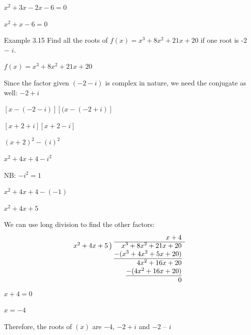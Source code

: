 $x^2 + 3x - 2x - 6 = 0$

$x^2 + x - 6 = 0$

\begin{example}{Example 3.15}
Find all the roots of $f(x) = x^3 + 8x^2 + 21x + 20$ if one root is -2 $-$ $i$.

\solution
$f(x) = x^3 + 8x^2 + 21x + 20$

Since the factor given $(-2 - i)$ is complex in nature, we need the conjugate as
well: $-2 + i$

$[x - (-2 - i)][(x - (-2 + i)]$

$[x + 2 + i][x + 2 - i]$

$(x + 2)^2 - (i)^2$

$x^2 + 4x + 4 - i^2$

NB: $-i^2 = 1$

$x^2 + 4x + 4 - (-1)$

$x^2 + 4x + 5$

We can use long division to find the other factors:
\[
\begin{array}{r@{\;}r}
 & x + 4 \\ \cline{2-2}
x^2 + 4x + 5\,\big) & x^3 + 8x^2 + 21x + 20 \\
 & \underline{-(x^3 + 4x^2 + 5x + 20)} \\
 & 4x^2 + 16x + 20 \\
 & \underline{-(4x^2 + 16x + 20)} \\
 & 0
\end{array}
\]
$x + 4 = 0$

$x = -4$

Therefore, the roots of $(x)$ are $-4$, $-2 + i$ and $-2$ -- $i$
\end{example}

